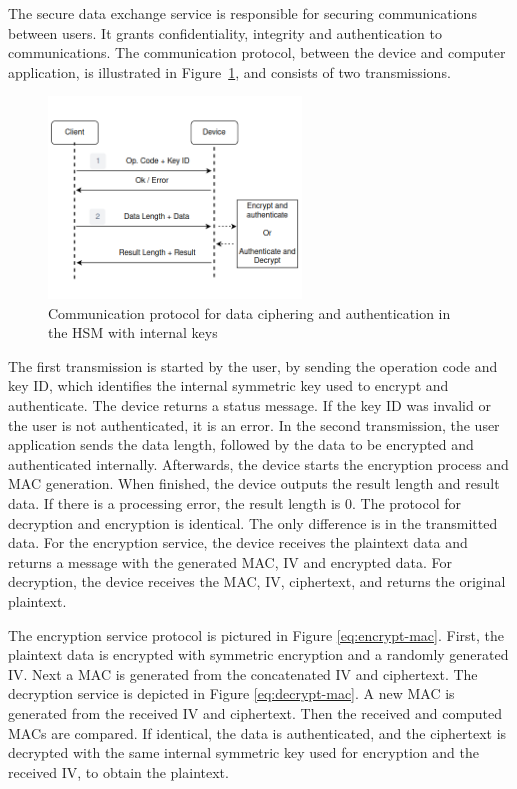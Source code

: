 The secure data exchange service is responsible for securing communications between users. It grants confidentiality, integrity and authentication to communications.
The communication protocol, between the device and computer application, is illustrated in Figure~\ref{fig:protocol:data-exchange}, and consists of two transmissions.
\begin{figure}[h!]
	\centering
	\includegraphics[width=0.60\textwidth]{./Images/data-exchange.png}
	\caption{Communication protocol for data ciphering and authentication in the HSM with internal keys}
	\label{fig:protocol:data-exchange}
\end{figure}

The first transmission is started by the user, by sending the operation code and key ID, which identifies the internal symmetric key used to encrypt and authenticate.
The device returns a status message. If the key ID was invalid or the user is not authenticated, it is an error.
In the second transmission, the user application sends the data length, followed by the data to be encrypted and authenticated internally.
Afterwards, the device starts the encryption process and MAC generation. When finished, the device outputs the result length and result data. If there is a processing error, the result length is 0.
The protocol for decryption and encryption is identical. The only difference is in the transmitted data. For the encryption service, the device receives the plaintext data and returns a message with the generated MAC, IV and encrypted data. For decryption, the device receives the MAC, IV, ciphertext, and returns the original plaintext.

The encryption service protocol is pictured in Figure \ref{eq:encrypt-mac}.
First, the plaintext data is encrypted with symmetric encryption and a randomly generated IV. Next a MAC is generated from the concatenated IV and ciphertext.
The decryption service is depicted in Figure \ref{eq:decrypt-mac}.
A new MAC is generated from the received IV and ciphertext. Then the received and computed MACs are compared. If identical, the data is authenticated, and the ciphertext is decrypted with the same internal symmetric key used for encryption and the received IV, to obtain the plaintext.

